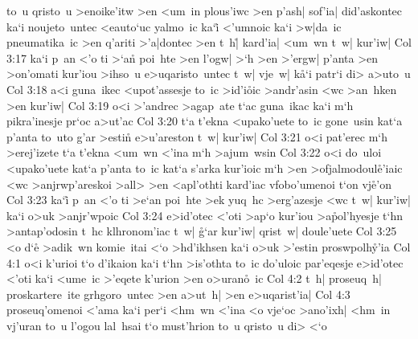 to~u
qristo~u
>enoike'itw
>en
<um~in
plous'iwc
>en
p'ash|
sof'ia|
did'askontec
ka`i
noujeto~untec
<eauto`uc
yalmo~ic
ka`i\r{}
<'umnoic
ka`i
>w|da~ic
pneumatika~ic
>en
q'ariti
>'a|dontec
>en
t~h|\r{}
kard'ia|
<um~wn
t~w|
kur'iw|\bibvsend
\vs Col 3:17
ka`i
p~an
<'o
ti
>`a\r{n}
poi~hte
>en
l'ogw|
>`h
>en
>'ergw|
p'anta
>en
>on'omati
kur'iou
>ihso~u
e>uqaristo~untec
t~w|
vje~w|
k\r{a}`i
patr`i
di>
a>uto~u\bibvsend
\vs Col 3:18
a<i
guna~ikec
<upot'assesje
to~ic
>id'i\r{o}ic
>andr'asin
<wc
>an~hken
>en
kur'iw|\bibvsend
\vs Col 3:19
o<i
>'andrec
>agap~ate
t`ac
guna~ikac
ka`i
m`h
pikra'inesje
pr`oc
a>ut'ac\bibvsend
\vs Col 3:20
t`a
t'ekna
<upako'uete
to~ic
gone~usin
kat`a
p'anta
to~uto
g'ar
>estin\r{}
e>u'areston
t~w|
kur'iw|\bibvsend
\vs Col 3:21
o<i
pat'erec
m`h
>erej'izete
t`a
t'ekna
<um~wn
<'ina
m`h
>ajum~wsin\bibvsend
\vs Col 3:22
o<i
do~uloi
<upako'uete
kat`a
p'anta
to~ic
kat`a
s'arka
kur'ioic
m`h
>en
>ofjalmodoul\r{e}'iaic
<wc
>anjrwp'areskoi
>all>
>en
<apl'othti
kard'iac
vfobo'umenoi
t`on
vj\r{e}'on\bibvsend
{}
\vs Col 3:23
ka`i\r{}
p~an
<'o
ti
>e`an
poi~hte
>ek
yuq~hc
>erg'azesje
<wc
t~w|
kur'iw|
ka`i
o>uk
>anjr'wpoic\bibvsend
\vs Col 3:24
e>id'otec
<'oti
>ap`o
kur'iou
>a\r{p}ol'hyesje
t`hn
>antap'odosin
t~hc
klhronom'iac
t~w|
\r{g}`ar
kur'iw|
qrist~w|
doule'uete\bibvsend
\vs Col 3:25
<o
d`e\r{}
>adik~wn
komie~itai
<`o
>hd'ikhsen
ka`i
o>uk
>'estin
proswpolh\r{y}'ia\bibvsend
{}
\vs Col 4:1
o<i
k'urioi
t`o
d'ikaion
ka`i
t`hn
>is'othta
to~ic
do'uloic
par'eqesje
e>id'otec
<'oti
ka`i
<ume~ic
>'eqete
k'urion
>en
o>uran\r{o}~ic\bibvsend
{}
\vs Col 4:2
t~h|
proseuq~h|
proskartere~ite
grhgoro~untec
>en
a>ut~h|
>en
e>uqarist'ia|\bibvsend
\vs Col 4:3
proseuq'omenoi
<'ama
ka`i
per`i
<hm~wn
<'ina
<o
vje`oc
>ano'ixh|
<hm~in
vj'uran
to~u
l'ogou
lal~hsai
t`o
must'hrion
to~u
qristo~u
di>
<`o
